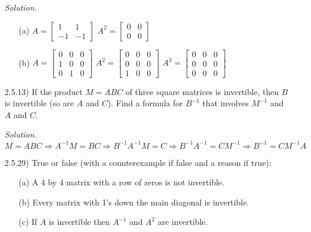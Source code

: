 \documentclass[12pt]{article}
\begin{document}
\begin{itemize}
\textit{Solution.}
	\begin{itemize}
	\item[(a)] $A=\left[\begin{array}{rr} 1 & 1 \\ -1 & -1 \end{array}\right]$
    \hspace{4mm} $A^2=\left[\begin{array}{rr} 0 & 0 \\0 & 0 \end{array}\right]$
    \item[(b)] $A=\left[\begin{array}{ccc} 0 & 0 & 0 \\ 1 & 0 & 0 \\ 0 & 1 & 0 \end{array}\right]$
    \hspace{4mm} $A^2=\left[\begin{array}{ccc} 0 & 0 & 0 \\ 0 & 0 & 0 \\ 1 & 0 & 0 \end{array}\right]$
    \hspace{4mm} $A^3=\left[\begin{array}{ccc} 0 & 0 & 0 \\ 0 & 0 & 0 \\ 0 & 0 & 0 \end{array}\right]$
	\end{itemize}

\item[2.5.13)] If the product $M=ABC$ of three square matrices is invertible, then $B$ is invertible (so are $A$ and $C$). Find a formula for $B^{-1}$ that involves $M^{-1}$ and $A$ and $C$.

\textit{Solution.}
\begin{equation*}
M=ABC \Rightarrow A^{-1}M=BC \Rightarrow B^{-1}A^{-1}M=C \Rightarrow B^{-1}A^{-1}=CM^{-1} \Rightarrow B^{-1}=CM^{-1}A
\end{equation*}

\item[2.5.29)] True or false (with a counterexample if false and a reason if true):
	\begin{itemize}
	\item[(a)] A 4 by 4 matrix with a row of zeros is not invertible.
    \item[(b)] Every matrix with 1's down the main diagonal is invertible.
    \item[(c)] If $A$ is invertible then $A^{-1}$ and $A^2$ are invertible.
	\end{itemize}
    

\end{itemize}
\end{document}
